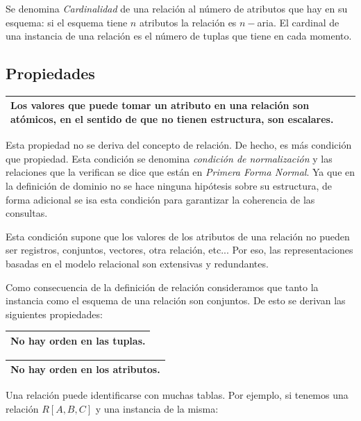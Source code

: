 \documentclass[10pt,a4paper,spanish]{report}
\begin{document}
Se denomina \textcolor[rgb]{1,0.2,0.3}{\textit{Cardinalidad}} de una relación al número de atributos que hay en su esquema: si el esquema tiene $n$ atributos la relación es $n-$aria. El cardinal de una instancia de una relación es el número de tuplas que tiene en cada momento.

\textcolor[rgb]{1,0.2,0.3}{\subsection{Propiedades}}
\begin{center}
\begin{tabular}{p{12cm}}
\hline
Los valores que puede tomar un atributo en una relación son atómicos, en el sentido de que no tienen estructura, son escalares. \\
\hline
\end{tabular}
\end{center}

Esta propiedad no se deriva del concepto de relación. De hecho, es más condición que propiedad. Esta condición se denomina \textit{\textcolor[rgb]{1,0.2,0.3}{condición de normalización}} y las relaciones que la verifican se dice que están en \textcolor[rgb]{1,0.2,0.3}{\textit{Primera Forma Normal}}. Ya que en la definición de dominio no se hace ninguna hipótesis sobre su estructura, de forma adicional se isa esta condición para garantizar la coherencia de las consultas.

Esta condición supone que los valores de los atributos de una relación no pueden ser registros, conjuntos, vectores, otra relación, etc... Por eso, las representaciones basadas en el modelo relacional son extensivas y redundantes.

Como consecuencia de la definición de relación consideramos que tanto la instancia como el esquema de una relación son conjuntos. De esto se derivan las siguientes propiedades:

\begin{center}
\begin{tabular}{p{6cm}}
\hline
No hay orden en las tuplas. \\
\hline
\end{tabular}

\begin{tabular}{p{6cm}}
\hline
No hay orden en los atributos. \\
\hline
\end{tabular}
\end{center}

Una relación puede identificarse con muchas tablas. Por ejemplo, si tenemos una relación $R[A,B,C]$ y una instancia de la misma:
\end{document}
